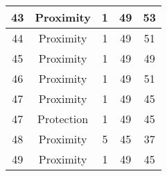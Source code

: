 \documentclass[results.tex]{subfiles}
\begin{document}
\begin{center}
\begin{tabular}{| c || c | c | c | c |}
    \hline
    43 & Proximity & 1 & 49 & 53 \\ 
    \hline
    44 & Proximity & 1 & 49 & 51 \\ 
    \hline
    45 & Proximity & 1 & 49 & 49 \\ 
    \hline
    46 & Proximity & 1 & 49 & 51 \\ 
    \hline
    47 & Proximity & 1 & 49 & 45 \\ 
    \hline
    47 & Protection & 1 & 49 & 45 \\ 
    \hline
    48 & Proximity & 5 & 45 & 37 \\ 
    \hline
    49 & Proximity & 1 & 49 & 45 \\ 
    \hline   \end{tabular}
\end{center}
\end{document}
